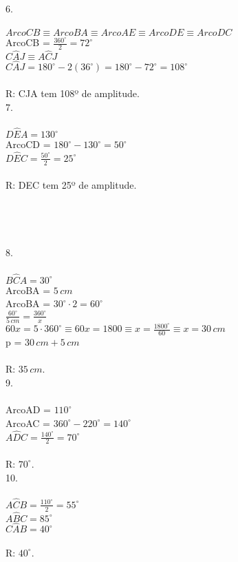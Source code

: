 \documentclass[12pt]{article}
\begin{document}
6.\\\\
$ArcoCB \equiv ArcoBA \equiv ArcoAE \equiv ArcoDE \equiv ArcoDC$\\
ArcoCB = $\frac{360^{\circ}}{2}=72^{\circ}$\\
$C\hat{A}J \equiv A\hat{C}J$\\
$C\hat{A}J=180^{\circ}-2(36^{\circ})=180^{\circ}-72^{\circ}=108^{\circ}$\\\\
R: CJA tem 108º de amplitude.\\

7.\\\\
$D\hat{E}A=130^{\circ}$\\
ArcoCD  = $180^{\circ}-130^{\circ}=50^{\circ}$\\
$D\hat{E}C=\frac{50^{\circ}}{2}=25^{\circ}$\\\\
R: DEC tem 25º de amplitude.\\\\\\\\\\

8.\\\\
$B\hat{C}A=30^{\circ}$\\
ArcoBA = $5\,cm$\\
ArcoBA = $30^{\circ}\cdot2=60^{\circ}$\\
$\frac{60^{\circ}}{5\,cm}=\frac{360^{\circ}}{x}$\\
$60x=5\cdot360^{\circ}\equiv60x=1800\equiv x=\frac{1800^{\circ}}{60}\equiv x=30\,cm$\\
p = $30\,cm+5\,cm$\\\\
R: $35\,cm$.\\

9.\\\\
ArcoAD = $110^{\circ}$\\
ArcoAC = $360^{\circ}-220^{\circ}=140^{\circ}$\\
$A\hat{D}C=\frac{140^{\circ}}{2}=70^{\circ}$\\\\
R: $70^{\circ}$.\\

10.\\\\
$A\hat{C}B=\frac{110^{\circ}}{2}=55^{\circ}$\\
$A\hat{B}C=85^{\circ}$\\
$C\hat{A}B=40^{\circ}$\\\\
R: $40^{\circ}$.\\
\end{document}
